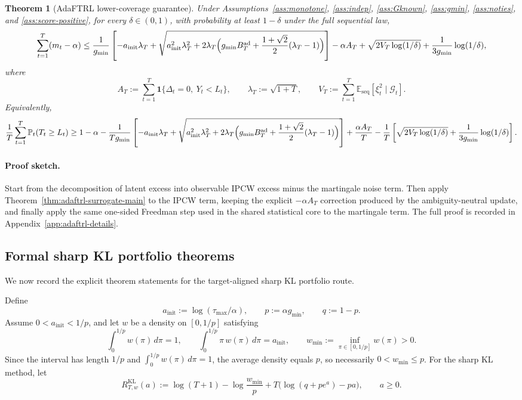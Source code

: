 \documentclass[11pt]{article}
\newtheorem{theorem}{Theorem}
\newcommand{\E}{\mathbb{E}}
\newcommand{\Prob}{\mathbb{P}}
\newcommand{\1}{\mathbf{1}}
\newcommand{\seq}{\mathrm{seq}}
\newcommand{\cG}{\mathcal{G}}
\begin{document}
\begin{theorem}[AdaFTRL lower-coverage guarantee]
\label{thm:adaftrl-final-main}
Under Assumptions~\ref{ass:monotone}, \ref{ass:indep}, \ref{ass:Gknown}, \ref{ass:gmin}, \ref{ass:noties}, and \ref{ass:score-positive}, for every \(\delta\in(0,1)\), with probability at least \(1-\delta\) under the full sequential law,
\[
\sum_{t=1}^T (m_t-\alpha)
\le
\frac{1}{g_{\min}}
\left[
-a_{\mathrm{init}}\lambda_T
+
\sqrt{
a_{\mathrm{init}}^2\lambda_T^2
+
2\lambda_T\Bigl(g_{\min}B_T^{\mathrm{ad}}+\frac{1+\sqrt{2}}{2}(\lambda_T-1)\Bigr)
}
\right]
-
\alpha A_T
+
\sqrt{2V_T\log(1/\delta)}
+
\frac{1}{3g_{\min}}\log(1/\delta),
\]
where
\[
A_T:=\sum_{t=1}^T \1\{\Delta_t=0,\ Y_t<L_t\},
\qquad
\lambda_T:=\sqrt{1+T},
\qquad
V_T:=\sum_{t=1}^T \E_{\seq}[\xi_t^2\mid \cG_t].
\]
Equivalently,
\[
\frac{1}{T}\sum_{t=1}^T \Prob_t(T_t\ge L_t)
\ge
1-\alpha
-
\frac{1}{Tg_{\min}}
\left[
-a_{\mathrm{init}}\lambda_T
+
\sqrt{
a_{\mathrm{init}}^2\lambda_T^2
+
2\lambda_T\Bigl(g_{\min}B_T^{\mathrm{ad}}+\frac{1+\sqrt{2}}{2}(\lambda_T-1)\Bigr)
}
\right]
+
\frac{\alpha A_T}{T}
-
\frac{1}{T}\left[
\sqrt{2V_T\log(1/\delta)}
+
\frac{1}{3g_{\min}}\log(1/\delta)
\right].
\]
\end{theorem}

\paragraph{Proof sketch.}
Start from the decomposition of latent excess into observable IPCW excess minus the martingale noise term. Then apply Theorem~\ref{thm:adaftrl-surrogate-main} to the IPCW term, keeping the explicit \(-\alpha A_T\) correction produced by the ambiguity-neutral update, and finally apply the same one-sided Freedman step used in the shared statistical core to the martingale term. The full proof is recorded in Appendix~\ref{app:adaftrl-details}.

\subsection{Formal sharp KL portfolio theorems}

We now record the explicit theorem statements for the target-aligned sharp KL portfolio route.

Define
\[
a_{\mathrm{init}}:=\log(\tau_{\max}/\alpha),
\qquad
p:=\alpha g_{\min},
\qquad
q:=1-p.
\]
Assume \(0<a_{\mathrm{init}}<1/p\), and let \(w\) be a density on \([0,1/p]\) satisfying
\[
\int_0^{1/p} w(\pi)\,d\pi=1,
\qquad
\int_0^{1/p}\pi\,w(\pi)\,d\pi=a_{\mathrm{init}},
\qquad
w_{\min}:=\inf_{\pi\in[0,1/p]}w(\pi)>0.
\]
Since the interval has length \(1/p\) and \(\int_0^{1/p} w(\pi)\,d\pi=1\), the average density equals \(p\), so necessarily \(0<w_{\min}\le p\).
For the sharp KL method, let
\[
R_{T,w}^{\mathrm{KL}}(a)
:=
\log(T+1)-\log\frac{w_{\min}}{p}
+
T\bigl(\log(q+pe^a)-pa\bigr),
\qquad a\ge 0.
\]
\end{document}
